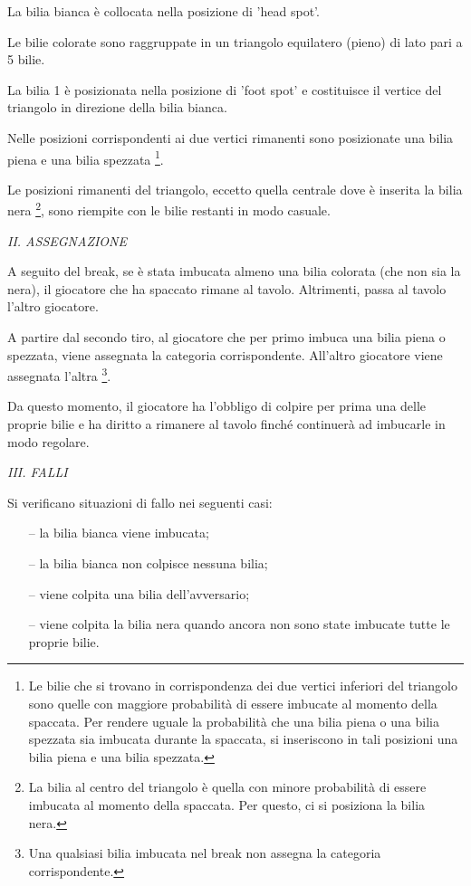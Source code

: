 \documentclass[12pt,a4paper]{report}
\begin{document}
La bilia bianca è collocata nella posizione di 'head spot'.

Le bilie colorate sono raggruppate in un triangolo equilatero (pieno) di lato pari a 5 bilie.

La bilia 1 è posizionata nella posizione di 'foot spot' e costituisce il vertice del triangolo in direzione della bilia bianca.

Nelle posizioni corrispondenti ai due vertici rimanenti sono posizionate una bilia piena e una bilia spezzata \footnote{Le bilie che si trovano in corrispondenza dei due vertici inferiori del triangolo sono quelle con maggiore probabilità di essere imbucate al momento della spaccata. Per rendere uguale la probabilità che una bilia piena o una bilia spezzata sia imbucata durante la spaccata, si inseriscono in tali posizioni una bilia piena e una bilia spezzata.}.

Le posizioni rimanenti del triangolo, eccetto quella centrale dove è inserita la bilia nera \footnote{La bilia al centro del triangolo è quella con minore probabilità di essere imbucata al momento della spaccata. Per questo, ci si posiziona la bilia nera.}, sono riempite con le bilie restanti in modo casuale.

\vspace{9mm}
\noindent \emph{II. ASSEGNAZIONE}

A seguito del break, se è stata imbucata almeno una bilia colorata (che non sia la nera), il giocatore che ha spaccato rimane al tavolo.
Altrimenti, passa al tavolo l'altro giocatore.

A partire dal secondo tiro, al giocatore che per primo imbuca una bilia piena o spezzata, viene assegnata la categoria corrispondente.
All'altro giocatore viene assegnata l'altra \footnote{Una qualsiasi bilia imbucata nel break non assegna la categoria corrispondente.}.

Da questo momento, il giocatore ha l'obbligo di colpire per prima una delle proprie bilie e ha diritto a rimanere al tavolo finché continuerà ad imbucarle in modo regolare.

\vspace{9mm}
\noindent \emph{III. FALLI}

Si verificano situazioni di fallo nei seguenti casi:
\begin{itemize}[noitemsep]
    \item[--]la bilia bianca viene imbucata;
    \item[--] la bilia bianca non colpisce nessuna bilia;
    \item[--] viene colpita una bilia dell'avversario;
    \item[--] viene colpita la bilia nera quando ancora non sono state imbucate tutte le proprie bilie.
\end{itemize}
\end{document}
